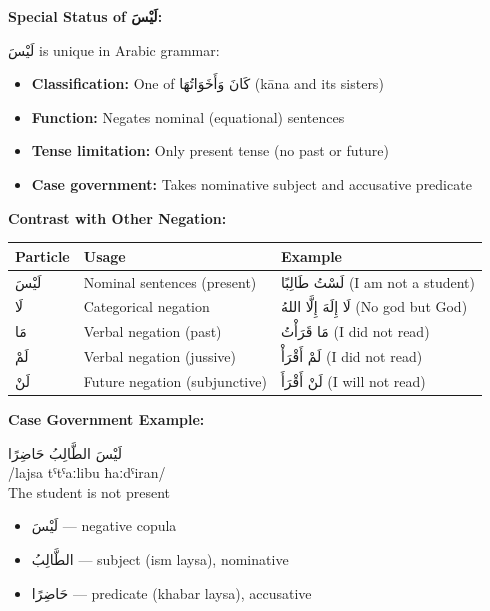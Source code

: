 \documentclass[letterpaper,12pt]{article}
\begin{document}
\begin{tcolorbox}[colback=boxcolor,colframe=headercolor,breakable]
\textbf{Special Status of \textarabic{لَيْسَ}:}

\textarabic{لَيْسَ} is unique in Arabic grammar:
\begin{itemize}
\item \textbf{Classification:} One of \textarabic{كَانَ وَأَخَوَاتُهَا} (kāna and its sisters)
\item \textbf{Function:} Negates nominal (equational) sentences
\item \textbf{Tense limitation:} Only present tense (no past or future)
\item \textbf{Case government:} Takes nominative subject and accusative predicate
\end{itemize}

\textbf{Contrast with Other Negation:}

\begin{tabular}{|l|l|l|}
\hline
\textbf{Particle} & \textbf{Usage} & \textbf{Example} \\
\hline
\textarabic{لَيْسَ} & Nominal sentences (present) & \textarabic{لَسْتُ طَالِبًا} (I am not a student) \\
\hline
\textarabic{لَا} & Categorical negation & \textarabic{لَا إِلَهَ إِلَّا اللهُ} (No god but God) \\
\hline
\textarabic{مَا} & Verbal negation (past) & \textarabic{مَا قَرَأْتُ} (I did not read) \\
\hline
\textarabic{لَمْ} & Verbal negation (jussive) & \textarabic{لَمْ أَقْرَأْ} (I did not read) \\
\hline
\textarabic{لَنْ} & Future negation (subjunctive) & \textarabic{لَنْ أَقْرَأَ} (I will not read) \\
\hline
\end{tabular}

\vspace{0.5em}
\textbf{Case Government Example:}

\textarabic{لَيْسَ الطَّالِبُ حَاضِرًا}\\
/lajsa tˤtˤaːlibu ħaːdˤiran/\\
The student is not present

\begin{itemize}
\item \textarabic{لَيْسَ} — negative copula
\item \textarabic{الطَّالِبُ} — subject (ism laysa), nominative
\item \textarabic{حَاضِرًا} — predicate (khabar laysa), accusative
\end{itemize}


\end{tcolorbox}
\end{document}
